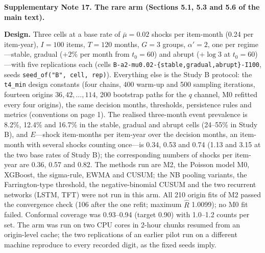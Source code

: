 \textbf{Supplementary Note 17. The rare arm (Sections 5.1, 5.3 and 5.6 of the main text).}

\textbf{Design.} Three cells at a base rate of $\bar{\mu} = 0.02$ shocks per item-month (0.24 per item-year), $I = 100$ items, $T = 120$ months, $G = 3$ groups, $\alpha' = 2$, one per regime---stable, gradual ($+2\%$ per month from $t_0 = 60$) and abrupt ($+\log 3$ at $t_0 = 60$)---with five replications each (cells \texttt{B-a2-mu0.02-\{stable,gradual,abrupt\}-I100}, seeds \texttt{seed\_of("B", cell, rep)}). Everything else is the Study B protocol: the \texttt{t4\_min} design constants (four chains, 400 warm-up and 500 sampling iterations, fourteen origins $36, 42, \dots, 114$, 200 bootstrap paths for the $q$ channel, M0 refitted every four origins), the same decision months, thresholds, persistence rules and metrics (conventions on page 1). The realised three-month event prevalence is 8.2\%, 12.4\% and 16.7\% in the stable, gradual and abrupt cells (24--55\% in Study B), and $E$---shock item-months per item-year over the decision months, an item-month with several shocks counting once---is 0.34, 0.53 and 0.74 (1.13 and 3.15 at the two base rates of Study B); the corresponding numbers of shocks per item-year are 0.36, 0.57 and 0.82. The methods run are M2, the Poisson model M0, XGBoost, the sigma-rule, EWMA and CUSUM; the NB pooling variants, the Farrington-type threshold, the negative-binomial CUSUM and the two recurrent networks (LSTM, TFT) were not run in this arm. All 210 origin fits of M2 passed the convergence check (106 after the one refit; maximum $\widehat{R}$ 1.0099); no M0 fit failed. Conformal coverage was 0.93--0.94 (target 0.90) with 1.0--1.2 counts per set. The arm was run on two CPU cores in 2-hour chunks resumed from an origin-level cache; the two replications of an earlier pilot run on a different machine reproduce to every recorded digit, as the fixed seeds imply.

